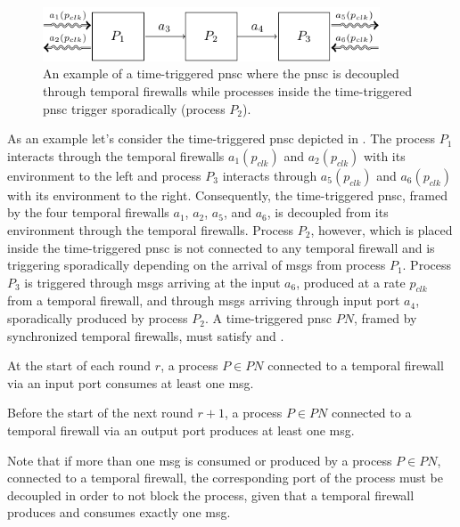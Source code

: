 \begin{figure}[bht]\begin{center}
\TopFigSpace
    \centering
    \includegraphics[width=10cm]{fig/procs_tf.pdf}
    \CaptionFigSpace
    \caption{An example of a time-triggered \gls{pnsc} where the \gls{pnsc} is decoupled through temporal firewalls while processes inside the time-triggered \gls{pnsc} trigger sporadically (\eg process $P_2$).}
    \label{fig_tcm_tfnw}
\BotFigSpace
\end{center}\end{figure}
As an example let's consider the time-triggered \gls{pnsc} depicted in \Fig{\ref{fig_tcm_tfnw}}.
The process $P_1$ interacts through the temporal firewalls $a_1(p_{clk})$ and $a_2(p_{clk})$ with its environment to the left and process $P_3$ interacts through $a_5(p_{clk})$ and $a_6(p_{clk})$ with its environment to the right.
Consequently, the time-triggered \gls{pnsc}, framed by the four temporal firewalls $a_1$, $a_2$, $a_5$, and $a_6$, is decoupled from its environment through the temporal firewalls.
Process $P_2$, however, which is placed inside the time-triggered \gls{pnsc} is not connected to any temporal firewall and is triggering sporadically depending on the arrival of \glspl*{msg} from process $P_1$.
Process $P_3$ is triggered through \glspl*{msg} arriving at the input $a_6$, produced at a rate $p_{clk}$ from a temporal firewall, and through \glspl*{msg} arriving through input port $a_4$, sporadically produced by process $P_2$.
A time-triggered \gls{pnsc} $\mathit{PN}$, framed by synchronized temporal firewalls, must satisfy \Propty{\ref{propty_tt_in}} and \Propty{\ref{propty_tt_out}}.
\begin{property}
    \label{propty_tt_in}
    At the start of each round $r$, a process $P \in \mathit{PN}$ connected to a temporal firewall via an input port consumes at least one \gls*{msg}.
\end{property}
\begin{property}
    \label{propty_tt_out}
    Before the start of the next round $r+1$, a process $P \in \mathit{PN}$ connected to a temporal firewall via an output port produces at least one \gls*{msg}.
\end{property}
Note that if more than one \gls*{msg} is consumed or produced by a process $P \in \mathit{PN}$, connected to a temporal firewall, the corresponding port of the process must be decoupled in order to not block the process, given that a temporal firewall produces and consumes exactly one \gls*{msg}.

